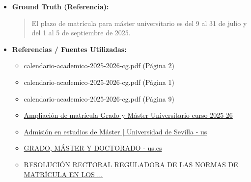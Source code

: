 \documentclass[12pt,a4paper,oneside]{report}
\begin{document}
\begin{itemize}
\begin{itemize}
\begin{quote}
Es importante tener en cuenta que estos plazos pueden estar sujetos a cambios y es recomendable consultar la información oficial de la Universidad de Sevilla para obtener la información más actualizada.
                \end{quote}
          \item \textbf{{Ground Truth (Referencia):}} \\
                \begin{quote}
El plazo de matrícula para máster universitario es del 9 al 31 de julio y del 1 al 5 de septiembre de 2025.
                \end{quote}
          \item \textbf{{Referencias / Fuentes Utilizadas:}} \\
                \begin{itemize}
                  \item calendario-academico-2025-2026-cg.pdf (Página 2)
                  \item calendario-academico-2025-2026-cg.pdf (Página 1)
                  \item calendario-academico-2025-2026-cg.pdf (Página 9)
                  \item \href{https://cat.us.es/index.php/noticias/ampliacion-de-matricula-grado-y-master-universitario-curso-2025-26}{Ampliación de matrícula Grado y Máster Universitario curso 2025-26}
                  \item \href{https://www.us.es/estudiar/admision/master}{Admisión en estudios de Máster | Universidad de Sevilla - us}
                  \item \href{https://www.us.es/sites/default/files/2025-03/CALENDARIO+ACADÉMICO+2025-2026+CG.pdf}{GRADO, MÁSTER Y DOCTORADO - us.es}
                  \item \href{https://www.us.es/sites/default/files/inline-files/R.R.+NORMAS+DE+MATRICULA+GRADO+Y+MASTER+UNIVERSITARIO+2025-2026.pdf}{RESOLUCIÓN RECTORAL REGULADORA DE LAS NORMAS DE MATRÍCULA EN LOS ...}
                \end{itemize}
        \end{itemize}


\end{itemize}
\end{document}
